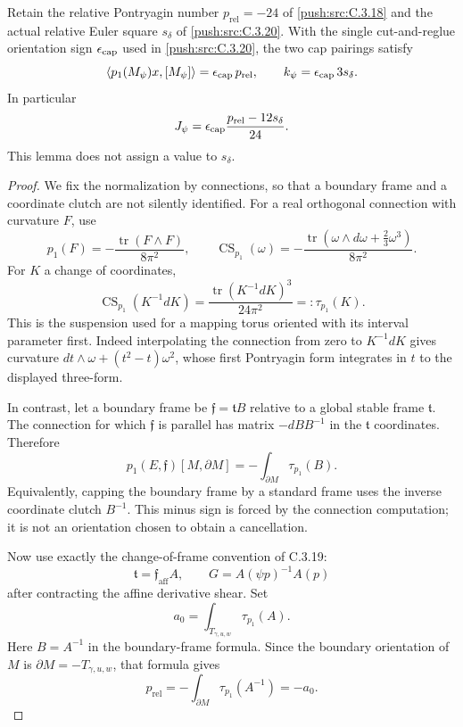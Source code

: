 \begin{lemma}\label{push:src:C.3.22}
Retain the relative Pontryagin number
$p_{\mathrm{rel}}=-24$ of \ref{push:src:C.3.18} and the actual relative
Euler square $s_\delta$ of \ref{push:src:C.3.20}. With the single
cut-and-reglue orientation sign $\epsilon_{\rm cap}$ used
in \ref{push:src:C.3.20}, the two cap pairings satisfy
\[
 \langle p_1(M_\psi)x,[M_\psi]\rangle
       =\epsilon_{\rm cap}\,p_{\mathrm{rel}},
 \qquad
 k_\psi=\epsilon_{\rm cap}\,3s_\delta.
\]
In particular
\[
 J_\psi=\epsilon_{\rm cap}
              \frac{p_{\mathrm{rel}}-12s_\delta}{24}.
\]
This lemma does not assign a value to $s_\delta$.
\end{lemma}
\begin{proof}
We fix the normalization by connections, so that a boundary
frame and a coordinate clutch are not silently identified.
For a real orthogonal connection with curvature $F$, use
\[
 p_1(F)=-\frac{\operatorname{tr}(F\wedge F)}{8\pi^2},
 \qquad
 \operatorname{CS}_{p_1}(\omega)
 =-\frac{\operatorname{tr}(\omega\wedge d\omega
                          +\tfrac23\omega^3)}{8\pi^2}.
\]
For $K$ a change of coordinates,
\[
 \operatorname{CS}_{p_1}(K^{-1}dK)
 =\frac{\operatorname{tr}(K^{-1}dK)^3}{24\pi^2}
 =:\tau_{p_1}(K).
\]
This is the suspension used for a mapping torus oriented
with its interval parameter first. Indeed interpolating
the connection from zero to $K^{-1}dK$ gives curvature
$dt\wedge\omega+(t^2-t)\omega^2$, whose first Pontryagin
form integrates in $t$ to the displayed three-form.

In contrast, let a boundary frame be
$\mathfrak f=\mathfrak t B$ relative to a global stable
frame $\mathfrak t$. The connection for which
$\mathfrak f$ is parallel has matrix $-dB B^{-1}$ in
the $\mathfrak t$ coordinates. Therefore
\[
 p_1(E,\mathfrak f)[M,\partial M]
 =-\int_{\partial M}\tau_{p_1}(B).
\]
Equivalently, capping the boundary frame by a standard
frame uses the inverse coordinate clutch $B^{-1}$.
This minus sign is forced by the connection computation;
it is not an orientation chosen to obtain a cancellation.

Now use exactly the change-of-frame convention of C.3.19:
\[
 \mathfrak t=\mathfrak f_{\mathrm{aff}} A,
 \qquad
 G=A(\psi p)^{-1}A(p)
\]
after contracting the affine derivative shear. Set
\[
 a_0=\int_{T_{\gamma,u,w}}\tau_{p_1}(A).
\]
Here $B=A^{-1}$ in the boundary-frame formula. Since
the boundary orientation of $M$ is
$\partial M=-T_{\gamma,u,w}$, that formula gives
\[
 p_{\mathrm{rel}}
 =-\int_{\partial M}\tau_{p_1}(A^{-1})
 =-a_0.
\]


\end{proof}
